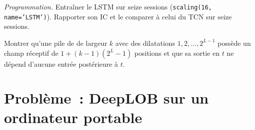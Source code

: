 \begin{exercise}[$\star\star\star$]\label{exo:ml:sequence-models-on-order-books:7}
\emph{Programmation.} Entraîner le LSTM sur seize sessions (\texttt{scaling(16, name='LSTM')}). Rapporter son IC et le comparer à celui du
TCN sur seize sessions.
\end{exercise}

\begin{exercise}[$\star\star\star$]\label{exo:ml:sequence-models-on-order-books:8}
Montrer qu'une pile de  de largeur $k$ avec des dilatations $1, 2,\dots,2^{L-1}$ possède un champ réceptif de
$1 + (k - 1)(2^L - 1)$ positions et que sa sortie en $t$ ne dépend d'aucune entrée postérieure à $t$.
\end{exercise}

\section{Problème~: DeepLOB sur un ordinateur portable}


